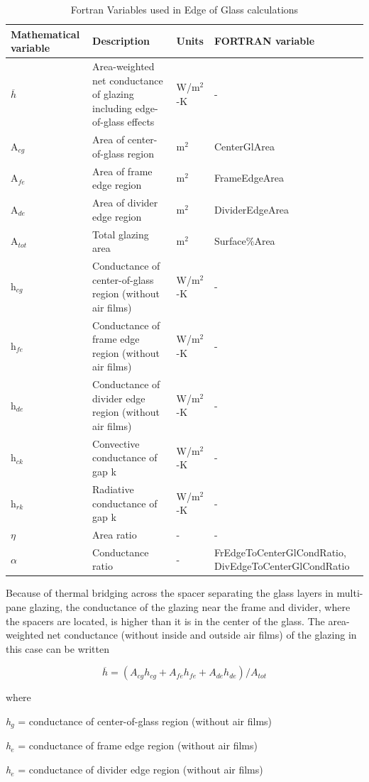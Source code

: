 \begin{longtable}[c]{p{1.0in}p{2.5in}p{1.0in}p{1.5in}}
\caption{Fortran Variables used in Edge of Glass calculations \protect \label{table:fortran-variables-used-in-edge-of-glass}}\\
\toprule 
Mathematical variable & Description & Units & FORTRAN \quad variable \tabularnewline \midrule
\endhead
\(\overline h\) & Area-weighted net conductance of glazing including edge-of-glass effects & W/m\(^{2}\)-K & - \tabularnewline
A\(_{cg}\) & Area of center-of-glass region & m\(^{2}\) & CenterGlArea \tabularnewline
A\(_{fe}\) & Area of frame edge region & m\(^{2}\) & FrameEdgeArea \tabularnewline
A\(_{de}\) & Area of divider edge region & m\(^{2}\) & DividerEdgeArea \tabularnewline
A\(_{tot}\) & Total glazing area & m\(^{2}\) & Surface\%Area \tabularnewline
h\(_{cg}\) & Conductance of center-of-glass region (without air films) & W/m\(^{2}\)-K & - \tabularnewline
h\(_{fe}\) & Conductance of frame edge region (without air films) & W/m\(^{2}\)-K & - \tabularnewline
h\(_{de}\) & Conductance of divider edge region (without air films) & W/m\(^{2}\)-K & - \tabularnewline
h\(_{ck}\) & Convective conductance of gap k & W/m\(^{2}\)-K & - \tabularnewline
h\(_{rk}\) & Radiative conductance of gap k & W/m\(^{2}\)-K & - \tabularnewline
$\eta$ & Area ratio & - & - \tabularnewline
$\alpha$ & Conductance ratio & - & FrEdgeToCenterGlCondRatio, DivEdgeToCenterGlCondRatio \tabularnewline
\bottomrule
\end{longtable}

Because of thermal bridging across the spacer separating the glass layers in multi-pane glazing, the conductance of the glazing near the frame and divider, where the spacers are located, is higher than it is in the center of the glass. The area-weighted net conductance (without inside and outside air films) of the glazing in this case can be written

\begin{equation}
\overline h  = \left( {{A_{cg}}{h_{cg}} + {A_{fe}}{h_{fe}} + {A_{de}}{h_{de}}} \right)/{A_{tot}}
\end{equation}

where

\emph{h\(_{g}\)} = conductance of center-of-glass region (without air films)

\emph{h\(_{e}\)} = conductance of frame edge region (without air films)

\emph{h\(_{e}\)} = conductance of divider edge region (without air films)

